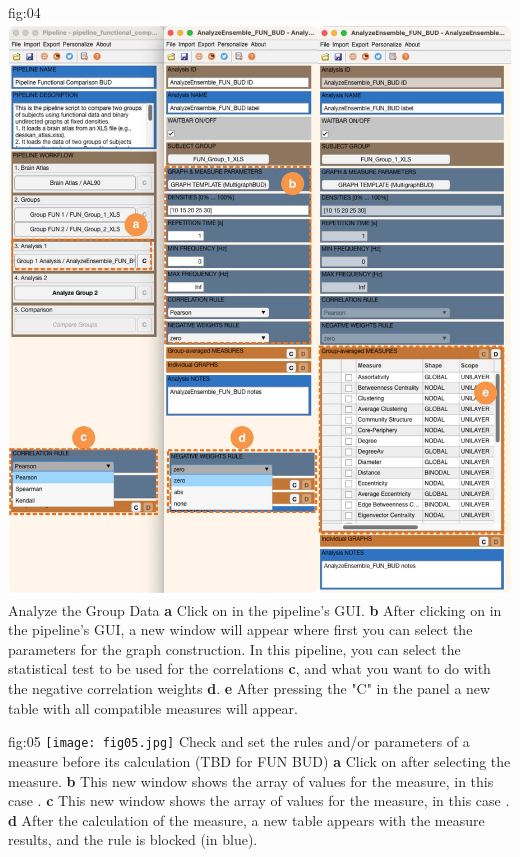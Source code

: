 \documentclass[justified]{tufte-handout}
\begin{document}
	{fig:04}
	{
	\includegraphics{fig04.jpg}
	}
	{Analyze the Group Data}
	{
	{\bf a} Click on  in the pipeline's GUI.
        {\bf b} After clicking on  in the pipeline's GUI, a new window will appear where first you can select the parameters for the graph construction. In this pipeline, you can select the statistical test to be used for the correlations {\bf c}, and what you want to do with the negative correlation weights {\bf d}. {\bf e} After pressing the "C" in the panel  a new table with all compatible measures will appear.
	}

	{fig:05}
	{
	\texttt{[image: fig05.jpg]}
	}
	{Check and set the rules and/or parameters of a measure before its calculation (TBD for FUN BUD)}
	{
	{\bf a} Click on  after selecting the measure.
	{\bf b} This new window shows the array of values for the measure, in this case .
 	{\bf c} This new window shows the array of values for the measure, in this case .
  	{\bf d} After the calculation of the measure, a new table appears with the measure results, and the rule is blocked (in blue).
	}
 
\end{document}
